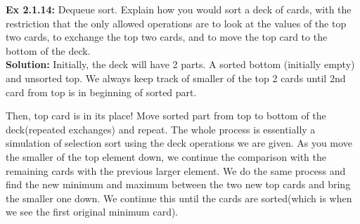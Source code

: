 \documentclass[11pt,fleqn]{article}
\begin{document}
\textbf{Ex 2.1.14:} Dequeue sort. Explain how you would sort a deck of cards, with the restriction
that the only allowed operations are to look at the values of the top two cards, to
exchange the top two cards, and to move the top card to the bottom of the deck.\\
	
\textbf{Solution:}
Initially, the deck will have 2 parts. A sorted bottom (initially empty) and unsorted top. We always keep track of smaller of the top 2 cards until 2nd card from top is in beginning of sorted part.

Then, top card is in its place! Move sorted part from top to bottom of the deck(repeated exchanges) and repeat. The whole process is essentially a simulation of selection sort using the deck operations we are given. As you move the smaller of the top element down, we continue the comparison with the remaining cards with the previous larger element. We do the same process and find the new minimum and maximum between the two new top cards and bring the smaller one down. We continue this until the cards are sorted(which is when we see the first original minimum card).
\end{document}

